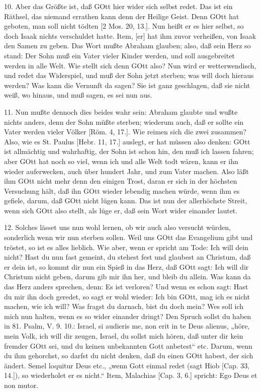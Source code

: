 10. Aber das Größte ist, daß GOtt hier wider sich selbst redet. Das ist ein Räthsel, das niemand errathen kann denn der Heilige Geist. Denn GOtt hat geboten, man soll nicht tödten [2 Mos. 20, 13.]. Nun heißt er es hier selbst, so doch Isaak nichts verschuldet hatte. Item, [er] hat ihm zuvor verheißen, von Isaak den Samen zu geben. Das Wort mußte Abraham glauben; also, daß sein Herz so stand: Der Sohn muß ein Vater vieler Kinder werden, und soll ausgebreitet werden in alle Welt. Wie stellt sich denn GOtt also? Nun wird er wetterwendisch, und redet das Widerspiel, und muß der Sohn jetzt sterben; was will doch hieraus werden? Was kann die Vernunft da sagen? Sie ist ganz geschlagen, daß sie nicht weiß, wo hinaus, und muß sagen, es sei nun aus.

11. Nun mußte dennoch dies beides wahr sein: Abraham glaubte und wußte nichts anders, denn der Sohn müßte sterben; wiederum auch, daß er sollte ein Vater werden vieler Völker [Röm. 4, 17.]. Wie reimen sich die zwei zusammen? Also, wie es St. Paulus [Hebr. 11, 17.] auslegt, er hat müssen also denken: GOtt ist allmächtig und wahrhaftig, der Sohn ist schon hin, den muß ich lassen fahren; aber GOtt hat noch so viel, wenn ich und alle Welt todt wären, kann er ihn wieder auferwecken, auch über hundert Jahr, und zum Vater machen. Also läßt ihm GOtt nicht mehr denn den einigen Trost, daran er sich in der höchsten Versuchung hält, daß ihn GOtt wieder lebendig machen würde, wenn ihm es gefiele, darum, daß GOtt nicht lügen kann. Das ist nun der allerhöchste Streit, wenn sich GOtt also stellt, als lüge er, daß sein Wort wider einander lautet.

12. Solches lässet uns nun wohl lernen, ob wir auch also versucht würden, sonderlich wenn wir nun sterben sollen. Weil uns GOtt das Evangelium gibt und tröstet, so ist es alles lieblich. Wie aber, wenn er spricht am Tode: Ich will dein nicht? Hast du nun fast gemeint, du stehest fest und glaubest an Christum, daß er dein ist, so kommt dir nun ein Spieß in das Herz, daß GOtt sagt: Ich will dir Christum nicht geben, darum gib mir ihn her, und bleib du allein. Was kann da das Herz anders sprechen, denn: Es ist verloren? Und wenn es schon sagt: Hast du mir ihn doch geredet, so sagt er wohl wieder: Ich bin GOtt, mag ich es nicht machen, wie ich will? Was fragst du darnach, bist du doch mein? Wes soll ich mich nun halten, wenn es so wider einander dringt? Den Spruch sollst du haben in 81. Psalm, V. 9. 10.: Israel, si audieris me, non erit in te Deus alienus, „höre, mein Volk, ich will dir zeugen, Israel, du sollst mich hören, daß unter dir kein fremder GOtt sei, und du keinen unbekannten Gott anbetest“ etc. Darum, wenn du ihm gehorchst, so darfst du nicht denken, daß du einen GOtt habest, der sich ändert. Semel loquitur Deus etc., „wenn Gott einmal redet (sagt Hiob [Cap. 33, 14.]), so wiederholet er es nicht.“ Item, Malachias [Cap. 3, 6.] spricht: Ego Deus et non mutor.

